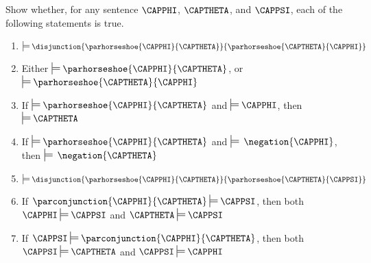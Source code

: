 
Show whether, for any \GSL{} sentence $\CAPPHI$, $\CAPTHETA$, and $\CAPPSI$, each of the following statements is true.
\begin{enumerate}
\item {$\sdtstile{}{}\disjunction{\parhorseshoe{\CAPPHI}{\CAPTHETA}}{\parhorseshoe{\CAPTHETA}{\CAPPHI}}$}
\item {Either $\sdtstile{}{}\parhorseshoe{\CAPPHI}{\CAPTHETA}$, or $\sdtstile{}{}\parhorseshoe{\CAPTHETA}{\CAPPHI}$}
\item {If $\sdtstile{}{}\parhorseshoe{\CAPPHI}{\CAPTHETA}$ and $\sdtstile{}{}\CAPPHI$, then $\sdtstile{}{}\CAPTHETA$}
\item {If $\sdtstile{}{}\parhorseshoe{\CAPPHI}{\CAPTHETA}$ and $\sdtstile{}{}\:\negation{\CAPPHI}$, then $\sdtstile{}{}\:\negation{\CAPTHETA}$}
\item {$\sdtstile{}{}\disjunction{\parhorseshoe{\CAPPHI}{\CAPTHETA}}{\parhorseshoe{\CAPTHETA}{\CAPPSI}}$}
\item {If $\parconjunction{\CAPPHI}{\CAPTHETA}\sdtstile{}{}\CAPPSI$, then both $\CAPPHI\sdtstile{}{}\CAPPSI$ and $\CAPTHETA\sdtstile{}{}\CAPPSI$}
\item {If $\CAPPSI\sdtstile{}{}\parconjunction{\CAPPHI}{\CAPTHETA}$, then both $\CAPPSI\sdtstile{}{}\CAPTHETA$ and $\CAPPSI\sdtstile{}{}\CAPPHI$}
\end{enumerate}

